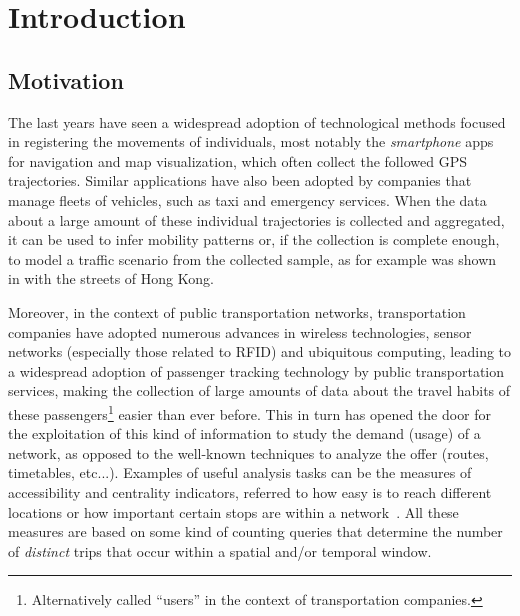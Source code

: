\documentclass[a4paper,10pt,twoside]{book}
\begin{document}
\pagestyle{fancy}\fancyfoot{}\fancyhead{}
\fancyhead[LO]{\slshape\nouppercase{\rightmark}}
\fancyhead[RE]{\slshape\nouppercase{\leftmark}}
\fancyhead[RO,LE]{\slshape \thepage}

\frontmatter




\mainmatter

\chapter{Introduction}
	\section{Motivation}
	The last years have seen a widespread adoption of technological methods focused in registering the movements of individuals, most notably the \textit{smartphone} apps for navigation and map visualization, which often collect the followed GPS trajectories. Similar applications have also been adopted by companies that manage fleets of vehicles, such as taxi and emergency services. When the data about a large amount of these individual trajectories is collected and aggregated, it can be used to infer mobility patterns \cite{liu2012understanding} or, if the collection is complete enough, to model a traffic scenario from the collected sample, as for example was shown in \cite{jiang2009street} with the streets of Hong Kong.
	
	Moreover, in the context of public transportation networks, transportation companies have adopted numerous advances in wireless technologies, sensor networks (especially those related to RFID) and ubiquitous computing, leading to a widespread adoption of passenger tracking technology by public transportation services, making the collection of large amounts of data about the travel habits of these passengers\footnote{Alternatively called ``users'' in the context of transportation companies.} easier than ever before.
	This in turn has opened the door for the exploitation of this kind of information to study the demand (usage) of a network, as opposed to the well-known techniques to analyze the offer (routes, timetables, etc...). 
	Examples of useful analysis tasks can be the measures of accessibility and centrality indicators, referred to how easy  is to reach different locations or how important certain stops are within a network~\cite{Morency2007193, El-Geneidy2011, Wang2015335}. All these measures are based on some kind of counting queries that determine the number of \textit{distinct} trips that occur within a spatial and/or temporal window.
	
\end{document}
